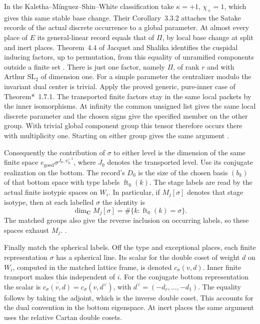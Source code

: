 In the Kaletha--M\'inguez--Shin--White classification take
\(\kappa=+1\), \(\chi_+=1\), which gives this same stable
base change. Their Corollary~3.3.2 attaches the Satake records
of the actual discrete occurrence to a global parameter.
At almost every place of \(E\) its general-linear record
equals that of \(\Pi\), by local base change at split and
inert places. Theorem~4.4 of Jacquet and Shalika identifies the
cuspidal inducing factors, up to permutation, from this equality of
unramified components outside a finite set \cite{rank-jacquet-shalika}.
There is just one factor, namely \(\Pi\), of rank \(r\) and with
Arthur \(\mathrm{SL}_2\) of dimension one. For a simple
parameter the centralizer modulo the invariant dual center is
trivial. Apply the proved generic, pure-inner case of
Theorem*~1.7.1. The transported finite factors stay in the
same local packets by the inner isomorphisms. At infinity
the common unsigned list gives the same local discrete
parameter and the chosen signs give the specified member on
the other group. With trivial global component group this
tensor therefore occurs there with multiplicity one. Starting
on either group gives the same argument \cite{rank-kmsw}.

Consequently the contribution of \(\sigma\) to either level is
the dimension of the same finite space
\(e_{\mathrm{good}}\sigma^{J_0,\psi_0^{-1}}\), where \(J_0\) denotes
the transported level. Use its conjugate realization on the
bottom. The record's \(D_0\) is the size of the chosen basis
\((b_k)\) of that bottom space with type labels \(\operatorname{ft}_0(k)\).
The stage labels are read by the actual finite isotypic spaces
on \(W_i\). In particular, if \(M_j[\sigma]\) denotes that
stage isotype, then at each labelled \(\sigma\) the identity is
\begin{equation}
 \label{eq:record-individual-isot-rank}
 \dim_{\mathbf C} M_j[\sigma]
 = \#\{k:\operatorname{ft}_0(k)=\sigma\}.
\end{equation}
The matched groups also give the reverse inclusion on occurring
labels, so these spaces exhaust \(M_j\).
.

Finally match the spherical labels. Off the type and exceptional
places, each finite representation \(\sigma\) has a spherical
line. Its scalar for the double coset of weight \(d\) on
\(W_i\), computed in the matched lattice frame, is denoted
\(c_\sigma(v,d)\). Inner finite transport makes this independent
of \(i\). For the conjugate bottom representation the scalar is
\(\overline{c_\sigma(v,d)}=c_\sigma(v,d^\vee)\), with
\(d^\vee=(-d_r,\ldots,-d_1)\). The equality follows by taking
the adjoint, which is the inverse double coset. This accounts for
the dual convention in the bottom eigenspace. At inert places
the same argument uses the relative Cartan double cosets.

